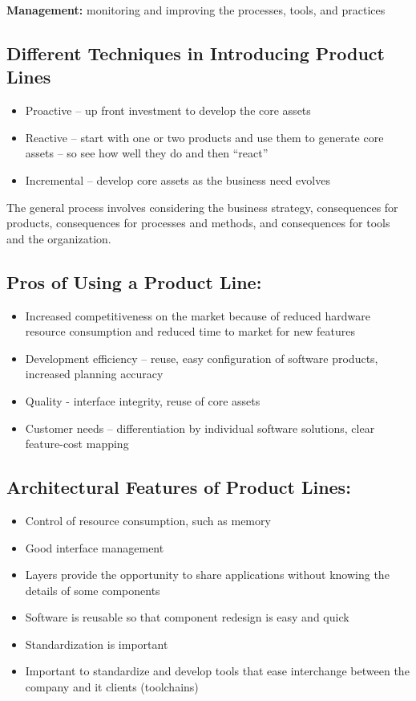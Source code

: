 \documentclass[a4paper]{article}
\begin{document}
\textbf{Management:} monitoring and improving the processes, tools, and practices

\subsection{Different Techniques in Introducing Product Lines}
\begin{itemize}
\item Proactive – up front investment to develop the core assets
\item Reactive – start with one or two products and use them to generate core assets – so see how well they do and then “react”
\item Incremental – develop core assets as the business need evolves
\end{itemize}
The general process involves considering the business strategy, consequences for products, consequences for processes and methods, and consequences for tools and the organization.

\subsection{Pros of Using a Product Line:}
\begin{itemize}
\item Increased competitiveness on the market because of reduced hardware resource consumption and reduced time to market for new features
\item Development efficiency – reuse, easy configuration of software products, increased planning accuracy
\item Quality  - interface integrity, reuse of core assets
\item Customer needs – differentiation by individual software solutions, clear feature-cost mapping
\end{itemize}

\subsection{Architectural Features of Product Lines:}
\begin{itemize}
\item Control of resource consumption, such as memory
\item Good interface management
\item Layers provide the opportunity to share applications without knowing the details of some components
\item Software is reusable so that component redesign is easy and quick
\item Standardization is important
\item Important to standardize and develop tools that ease interchange between the company and it clients (toolchains)
\end{itemize}
\end{document}
